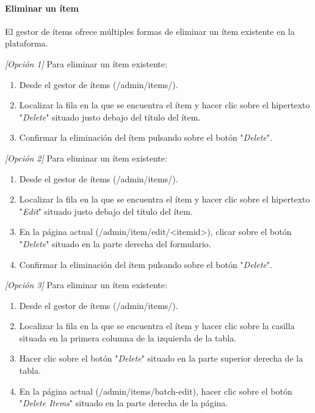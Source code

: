 \documentclass[
]{article}
\providecommand{\tightlist}{%
  \setlength{\itemsep}{0pt}\setlength{\parskip}{0pt}}
\begin{document}
\hypertarget{eliminar-un-uxedtem}{%
\paragraph{Eliminar un ítem}\label{eliminar-un-uxedtem}}

El gestor de ítems ofrece múltiples formas de eliminar un ítem existente
en la plataforma.

\emph{{[}Opción 1{]}} Para eliminar un ítem existente:

\begin{enumerate}
\def\labelenumi{\arabic{enumi}.}
\tightlist
\item
  Desde el gestor de ítems ({/admin/items/}).
\item
  Localizar la fila en la que se encuentra el ítem y hacer clic sobre el
  hipertexto "\emph{Delete}" situado justo debajo del título del ítem.
\item
  Confirmar la eliminación del ítem pulsando sobre el botón
  "\emph{Delete}".
\end{enumerate}

\emph{{[}Opción 2{]}} Para eliminar un ítem existente:

\begin{enumerate}
\def\labelenumi{\arabic{enumi}.}
\tightlist
\item
  Desde el gestor de ítems ({/admin/items/}).
\item
  Localizar la fila en la que se encuentra el ítem y hacer clic sobre el
  hipertexto "\emph{Edit}" situado justo debajo del título del ítem.
\item
  En la página actual
  ({/admin/item/edit/\textless itemid\textgreater{}}), clicar sobre el
  botón "\emph{Delete}" situado en la parte derecha del formulario.
\item
  Confirmar la eliminación del ítem pulsando sobre el botón
  "\emph{Delete}".
\end{enumerate}

\emph{{[}Opción 3{]}} Para eliminar un ítem existente:

\begin{enumerate}
\def\labelenumi{\arabic{enumi}.}
\tightlist
\item
  Desde el gestor de ítems ({/admin/items/}).
\item
  Localizar la fila en la que se encuentra el ítem y hacer clic sobre la
  casilla situada en la primera columna de la izquierda de la tabla.
\item
  Hacer clic sobre el botón "\emph{Delete}" situado en la parte superior
  derecha de la tabla.
\item
  En la página actual ({/admin/items/batch-edit}), hacer clic sobre el
  botón "\emph{Delete Items}" situado en la parte derecha de la página.
\end{enumerate}
\end{document}
